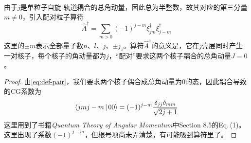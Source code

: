 由于$j$是单粒子自旋-轨道耦合的总角动量，因此总为半整数，故其对应的第三分量$m\neq 0$，引入配对粒子算符
\begin{equation}
    \hat{A}^{\dagger} = \sum_{m > 0} (-1)^{j - m} \xi_{jm}^{\dagger} \xi_{j-m}^{\dagger}
    \label{eq:def-pair}
\end{equation}
这里的$\pm m$表示全部量子数$n$、$l$、$j$、$\pm j_z$。算符$\hat{A}^{\dagger}$的意义是，它在$j$壳层同时产生一对核子，每个核子的角动量都为$j$，“配对”要求这两个核子耦合的总角动量$J = 0$。
\begin{proof}
    由\autoref{eq:def-pair}，我们要求两个核子偶合成总角动量为0的态，因此耦合导致的CG系数为
    \begin{equation*}
        \Braket{jmj-m | 00} = (-1)^{j - m} \frac{\delta_{jj}\delta_{mm}}{\sqrt{2j + 1}}
    \end{equation*}
    这里用到了书籍\textit{Quantum Theory of Angular Momentum}中Section 8.5的Eq.\,(1)。
    这里出现了系数$(-1)^{j-m}$，但根号项尚未弄清楚，有可能吸到算符里了。
\end{proof}


